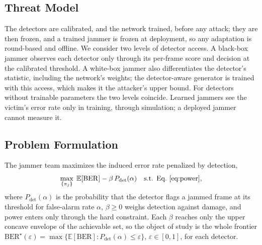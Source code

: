 \subsection{Threat Model}
\label{sec:threat}
The detectors are calibrated, and the network trained, before any attack; they are then frozen, and a trained jammer is frozen at deployment, so any adaptation is round-based and offline.
We consider two levels of detector access.
A black-box jammer observes each detector only through its per-frame score and decision at the calibrated threshold.
A white-box jammer also differentiates the detector's statistic, including the network's weights; the detector-aware generator is trained with this access, which makes it the attacker's upper bound.
For detectors without trainable parameters the two levels coincide.
Learned jammers see the victim's error rate only in training, through simulation; a deployed jammer cannot measure it.

\subsection{Problem Formulation}
\label{sec:objective}
The jammer team maximizes the induced error rate penalized by detection,
\begin{equation}
\max_{\{\pi_j\}}\;\mathbb{E}[\mathrm{BER}]-\beta\,P_{\mathrm{det}}(\alpha)\quad\text{s.t. Eq.~\eqref{eq:power}},
\label{eq:problem}
\end{equation}
where $P_{\mathrm{det}}(\alpha)$ is the probability that the detector flags a jammed frame at its threshold for false-alarm rate $\alpha$, $\beta\ge0$ weighs detection against damage, and power enters only through the hard constraint.
Each $\beta$ reaches only the upper concave envelope of the achievable set, so the object of study is the whole frontier $\mathrm{BER}^\star(\varepsilon)=\max\{\mathbb{E}[\mathrm{BER}]:P_{\mathrm{det}}(\alpha)\le\varepsilon\}$, $\varepsilon\in[0,1]$, for each detector.

